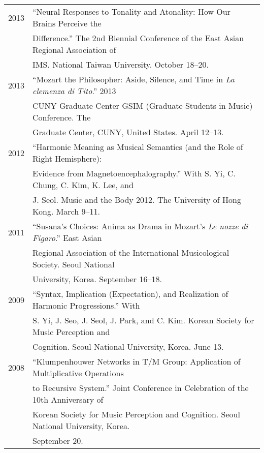 \documentclass[letter,11pt,draft]{article}
\begin{document}
  \hspace*{-0.25cm}
  \begin{tabular}{p{2.5cm} p{12.5cm}}
  2013 & “Neural Responses to Tonality and Atonality: How Our Brains Perceive the\\
  & Difference.” The 2nd Biennial Conference of the East Asian Regional Association of\\
  & IMS. National Taiwan University. October 18–20.\\[2mm]

  2013 & “Mozart the Philosopher: Aside, Silence, and Time in \textit{La clemenza di Tito}.” 2013\\
  & CUNY Graduate Center GSIM (Graduate Students in Music) Conference. The\\
  & Graduate Center, CUNY, United States. April 12–13.\\[2mm]

  2012 & “Harmonic Meaning as Musical Semantics (and the Role of Right Hemisphere):\\
  & Evidence from Magnetoencephalography.” With S. Yi, C. Chung, C. Kim, K. Lee, and\\
  & J. Seol. Music and the Body 2012. The University of Hong Kong. March 9–11.\\[2mm]

  2011 & “Susana’s Choices: Anima as Drama in Mozart’s \textit{Le nozze di Figaro}.” East Asian\\
  & Regional Association of the International Musicological Society. Seoul National\\
  & University, Korea. September 16–18.\\[2mm]

  2009 & “Syntax, Implication (Expectation), and Realization of Harmonic Progressions.” With\\
  & S. Yi, J. Seo, J. Seol, J. Park, and C. Kim. Korean Society for Music Perception and\\
  & Cognition. Seoul National University, Korea. June 13.\\[2mm]

  2008 & “Klumpenhouwer Networks in T/M Group: Application of Multiplicative Operations\\
  & to Recursive System.” Joint Conference in Celebration of the 10th Anniversary of\\
  & Korean Society for Music Perception and Cognition. Seoul National University, Korea.\\
  & September 20.
  \end{tabular}
  
\end{document}
